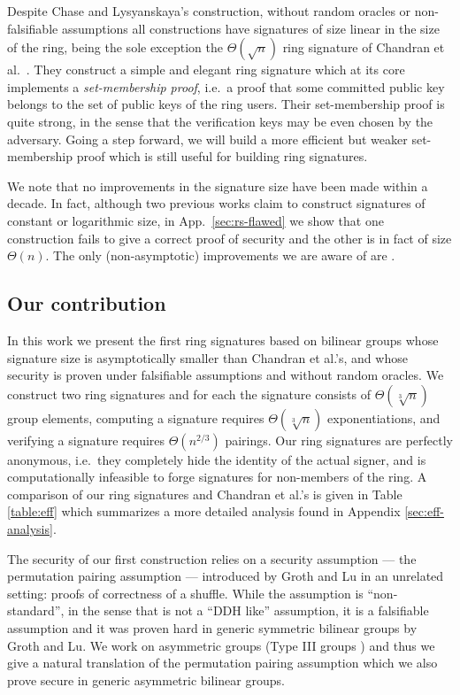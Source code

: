 Despite Chase and Lysyanskaya's construction, without random oracles or non-falsifiable assumptions all constructions have signatures of size linear in the size of the ring, being the sole exception the $\Theta(\sqrt{n})$ ring signature of Chandran et al.~\cite{ICALP:ChaGroSah07}. They construct a simple and elegant ring signature which at its core implements a \emph{set-membership proof}, i.e.~a proof that some committed public key belongs to the set of public keys of the ring users. Their set-membership proof is quite strong, in the sense that the verification keys may be even chosen by the adversary. Going a step forward, we will build a more efficient but weaker set-membership proof which is still useful for building ring signatures.

We note that no improvements in the
signature size have been made within a decade. In fact, although two previous works claim to construct signatures of constant \cite{ACISP:BosDasRan15} or logarithmic \cite{IET:GriSusPla16} size, in App.~\ref{sec:rs-flawed} we show that one construction fails to give a correct proof of security and the other is in fact of size $\Theta(n)$. The only (non-asymptotic) improvements we are aware of are \cite{TCC:Rafols15,AC:GonHevRaf15}.

\subsection{Our contribution}
In this work we present the first ring signatures based on bilinear groups whose signature size is asymptotically smaller than Chandran et al.'s, and whose security is proven under falsifiable assumptions and without random oracles. We construct two ring signatures and for each the signature consists of $\Theta(\sqrt[3]{n})$ group elements, computing a signature requires $\Theta(\sqrt[3]{n})$ exponentiations, and verifying a signature requires $\Theta(n^{2/3})$ pairings. Our ring signatures are perfectly anonymous, i.e.~they completely hide the identity of the actual signer, and is computationally infeasible to forge signatures for non-members of the ring. A comparison of our ring signatures and Chandran et al.'s is given in Table \ref{table:eff} which summarizes a more detailed analysis found in Appendix \ref{sec:eff-analysis}.

The security of our first construction relies on a security assumption --- the {permutation pairing assumption} --- introduced by Groth and Lu \cite{AC:GroLu07} in an unrelated setting: proofs of correctness of a shuffle. While the assumption is ``non-standard'', in the sense that is not a ``DDH like'' assumption, it is a falsifiable assumption and it was proven hard in generic symmetric bilinear groups by Groth and Lu. We work on asymmetric groups (Type III groups \cite{EPRINT:GalPatSma06}) and thus we give a natural translation of the permutation pairing assumption which we also prove secure in generic asymmetric bilinear groups.

